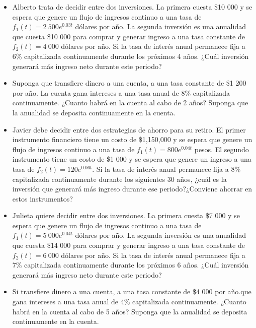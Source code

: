 \documentclass{article}
\begin{document}
        \begin{itemize}
            \item Alberto trata de decidir entre dos inversiones. La primera cuesta \$10 000 y se espera que genere un flujo de ingresos continuo a una tasa de $f_1(t)=2\ 500e^{0.03t}$ dólares por año. La segunda inversión es una anualidad que cuesta \$10 000 para comprar y generar ingreso a una tasa constante de $f_2(t)=4\ 000$ dólares por año. Si la tasa de interés anual permanece fija a 6\% capitalizada continuamente durante los próximos 4 años. ¿Cuál inversión generará más ingreso neto durante este periodo?
            
            \item Suponga que transfiere dinero a una cuenta, a una tasa constante de \$1 200 por año. La cuenta gana intereses a una tasa anual de 8\% capitalizada continuamente. ¿Cuanto habrá en la cuenta al cabo de 2 años? Suponga que la anualidad se deposita continuamente en la cuenta.
            
            \item Javier debe decidir entre dos estrategias de ahorro para su retiro. El primer instrumento financiero tiene un costo de \$1,150,000 y se espera que genere un flujo de ingresos continuo a una tasa de $f_{1}(t)=800e^{0.04t}$ pesos. El segundo instrumento tiene un costo de \$1 000 y se espera que genere un ingreso a una tasa de $f_{2}(t)=120e^{0.06t}$. Si la tasa de interés anual permanece fija a 8\% capitalizada continuamente durante los siguientes 30 años, ¿cuál es la inversión que generará más ingreso durante ese periodo?¿Conviene ahorrar en estos instrumentos?
            
            \item Julieta quiere decidir entre dos inversiones. La primera cuesta \$7 000 y se espera que genere un flujo de ingresos continuo a una tasa de $f_1(t)=5\ 000e^{0.04t}$ dólares por año. La segunda inversión es una anualidad que cuesta \$14 000 para comprar y generar ingreso a una tasa constante de $f_2(t)=6\ 000$ dólares por año. Si la tasa de interés anual permanece fija a 7\% capitalizada continuamente durante los próximos 6 años. ¿Cuál inversión generará más ingreso neto durante este periodo?
            
            \item Si transfiere dinero a una cuenta, a una tasa constante de \$4 000 por año.que gana intereses a una tasa anual de 4\% capitalizada continuamente. ¿Cuanto habrá en la cuenta al cabo de 5 años? Suponga que la anualidad se deposita continuamente en la cuenta.
            
        \end{itemize}
\end{document}
